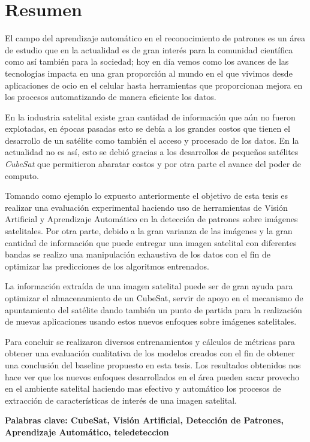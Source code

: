 \chapter*{Resumen}
\label{chap:resumen}

El campo del aprendizaje automático en el reconocimiento de patrones es un área de estudio que en la actualidad es de gran interés para la comunidad científica como así también para la sociedad; hoy en día vemos como los avances de las tecnologías impacta en una gran proporción al mundo en el que vivimos desde aplicaciones de ocio en el celular hasta herramientas que proporcionan mejora en los procesos automatizando de manera eficiente los datos.

En la industria satelital existe gran cantidad de información que aún no fueron explotadas, en épocas pasadas esto se debía a los grandes costos que tienen el desarrollo de un satélite como también el acceso y procesado de los datos. En la actualidad no es así, esto se debió gracias a los desarrollos de pequeños satélites \textit{CubeSat} que permitieron abaratar costos y por otra parte el avance del poder de computo.

Tomando como ejemplo lo expuesto anteriormente el objetivo de esta tesis es realizar una evaluación experimental haciendo uso  de herramientas de Visión Artificial y Aprendizaje Automático en la detección de patrones sobre imágenes satelitales. 
Por otra parte, debido a la gran varianza de las imágenes y la gran cantidad de información que puede entregar una imagen satelital con diferentes bandas se realizo una manipulación exhaustiva de los datos con el fin de optimizar las predicciones de los algoritmos entrenados. 

La información extraída de una imagen satelital puede ser de gran ayuda para optimizar el almacenamiento de un CubeSat, servir de apoyo en el mecanismo de apuntamiento del satélite dando también un punto de partida para la realización de nuevas aplicaciones usando estos nuevos enfoques sobre imágenes satelitales.

Para concluir se realizaron diversos entrenamientos y cálculos de métricas para obtener una evaluación cualitativa de los modelos creados con el fin de obtener una conclusión del baseline propuesto en esta tesis. Los resultados obtenidos nos hace ver que los nuevos enfoques desarrollados en el área pueden sacar provecho en el ambiente satelital haciendo mas efectivo y automático los procesos de extracción de características de interés de una imagen satelital.


\textbf{Palabras clave: CubeSat, Visión Artificial, Detección de Patrones, Aprendizaje Automático, teledeteccion}

